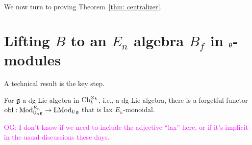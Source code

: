 \documentclass[11pt]{amsart}
\numberwithin{equation}{section}
\def\owen{\textcolor{magenta}{OG: }\textcolor{magenta}}
\begin{document}
%
%

We now turn to proving Theorem~\ref{thm: centralizer}.

\section{Lifting $B$ to an $E_n$ algebra $B_f$ in $\mathfrak g$-modules}

A technical result is the key step.

\def\obl{{\rm obl}}

\begin{prp}
\label{prp: def of obl}
For $\mathfrak g$ a dg Lie algebra in ${\rm Ch}_k^{\otimes_k}$, i.e., a dg Lie algebra, 
there is a forgetful functor $\obl: \Mod^{E_n}_{\UU_n \fg} \to \LMod_{U\fg}$ that is lax $E_n$-monoidal.
\end{prp}

\owen{I don't know if we need to include the adjective ``lax'' here, or if it's implicit in the usual discussions these days.}
\end{document}
